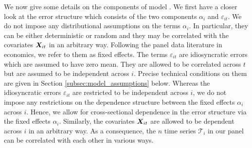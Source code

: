 \documentclass[12pt]{article}
\makeatletter
\renewcommand{\eqref}[1]{\tagform@{\ref{#1}}}
\makeatother
\begin{document}
We now give some details on the components of model \eqref{eq:model_full}. We first have a closer look at the error structure which consists of the two components $\alpha_i$ and $\varepsilon_{it}$. We do not impose any distributional assumptions on the terms $\alpha_i$. In particular, they can be either deterministic or random and they may be correlated with the covariates $\boldsymbol{X}_{it}$ in an arbitrary way. Following the panel data literature in economics, we refer to them as fixed effects. The terms $\varepsilon_{it}$ are idiosyncratic errors which are assumed to have zero mean. They are allowed to be correlated across $t$ but are assumed to be independent across $i$. Precise technical conditions on them are given in Section \ref{subsec:model_assumptions} below.  Whereas the idiosyncratic errors $\varepsilon_{it}$ are restricted to be independent across $i$, we do not impose any restrictions on the dependence structure between the fixed effects $\alpha_i$ across $i$. Hence, we allow for cross-sectional dependence in the error structure via the fixed effects $\alpha_i$. Similarly, the covariates $\boldsymbol{X}_{it}$ are allowed to be dependent across $i$ in an arbitrary way. As a consequence, the $n$ time series $\mathcal{T}_i$ in our panel can be correlated with each other in various ways.  
\end{document}
